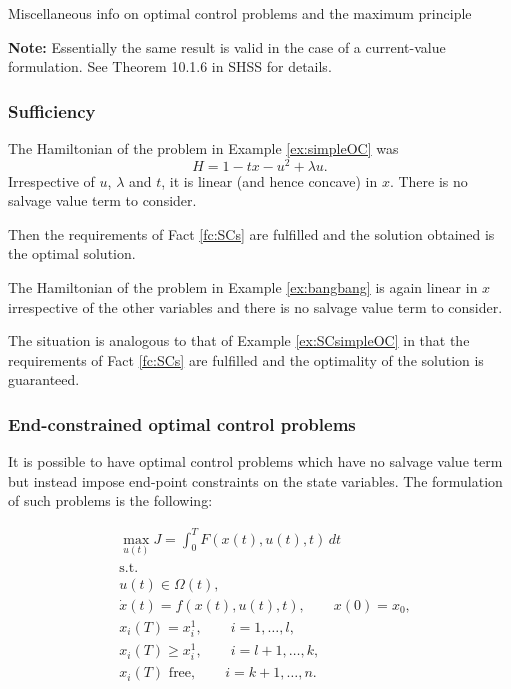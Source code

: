 \documentclass[10pt]{beamer}
\theoremstyle{definition}
\begin{document}
\begin{section}{Miscellaneous info on optimal control problems and the maximum principle}
\begin{frame}[fragile]
\textbf{Note:} Essentially the same result is valid in the case of a current-value formulation. See Theorem 10.1.6 in SHSS for details.
\end{frame}

\begin{frame}[fragile]
\frametitle{Sufficiency}
\begin{example}
The Hamiltonian of the problem in Example \ref{ex:simpleOC} was \[ H = 1-tx-u^2+\lambda u. \] Irrespective of $ u $, $ \lambda $ and $ t $, it is linear (and hence concave) in $ x $. There is no salvage value term to consider.

Then the requirements of Fact \ref{fc:SCs} are fulfilled and the solution obtained is the optimal solution.
\label{ex:SCsimpleOC}
\end{example}

\begin{example}
The Hamiltonian of the problem in Example \ref{ex:bangbang} is again linear in $ x $ irrespective of the other variables and there is no salvage value term to consider.

The situation is analogous to that of Example \ref{ex:SCsimpleOC} in that the requirements of Fact \ref{fc:SCs} are fulfilled and the optimality of the solution is guaranteed.
\label{ex:SCbangbang}
\end{example}
\end{frame}

\begin{frame}[fragile]
\frametitle{End-constrained optimal control problems}
It is possible to have optimal control problems which have no salvage value term but instead impose end-point constraints on the state variables. The formulation of such problems is the following: \bigskip

\begin{equation}
\begin{split}
& \max_{u(t)} J = \int_{0}^{T}F(x(t),u(t),t)\,dt  \\
&\text{s.t.}\\
& u(t)\in \Omega(t) ,\\
& \dot{x}(t)=f(x(t),u(t),t),\qquad x(0)=x_0,\\
& x_i(T) = x^1_i,\qquad i=1,\ldots,l,\\
& x_i(T) \geq x^1_i,\qquad i=l+1,\ldots,k,\\
& x_i(T) \text{ free},\qquad i=k+1,\ldots,n.\\
\end{split}
\label{eq:endconstrOC}
\end{equation}
\end{frame}


\end{section}
\end{document}
